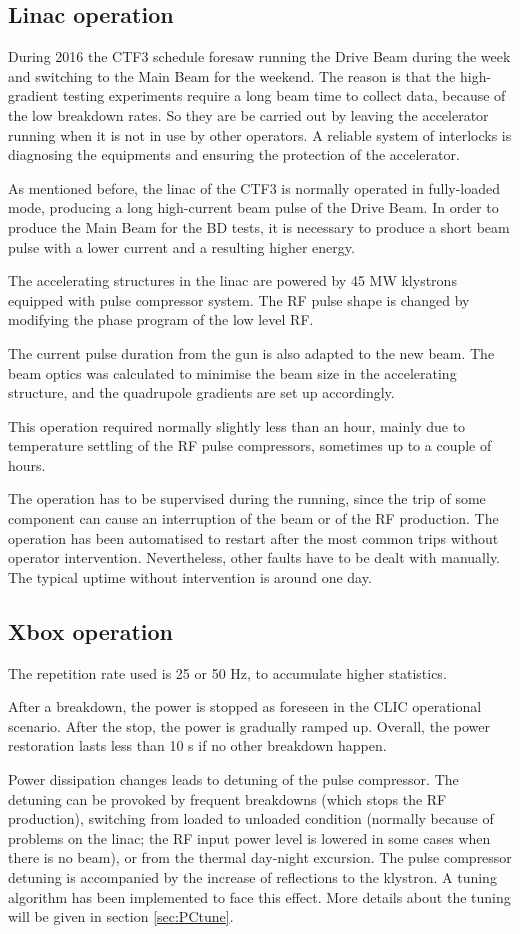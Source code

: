\subsection{Linac operation}

During 2016 the CTF3 schedule foresaw running the Drive Beam during the week and switching to the Main Beam for the weekend. The reason is that the high-gradient testing experiments require a long beam time to collect data, because of the low breakdown rates. So they are be carried out by leaving the accelerator running when it is not in use by other operators. A reliable system of interlocks is diagnosing the equipments and ensuring the protection of the accelerator. 

As mentioned before, the linac of the CTF3 is normally operated in fully-loaded mode, producing a long  high-current beam pulse of the Drive Beam. In order to produce the Main Beam for the BD tests, it is necessary to produce a short beam pulse with a lower current and a resulting higher energy. 

The accelerating structures in the linac are powered by 45 MW klystrons equipped with pulse compressor system. 
The RF pulse shape is changed by modifying the phase program of the low level RF.

The current pulse duration from the gun is also adapted to the new beam. The beam optics was calculated to minimise the beam size in the accelerating structure, and the quadrupole gradients are set up accordingly.

This operation required normally slightly less than an hour, mainly due to temperature settling of the RF pulse compressors, sometimes up to a couple of hours.

The operation has to be supervised during the running, since the trip of some component can cause an interruption of the beam or of the RF production. The operation has been automatised to restart after the most common trips without operator intervention. Nevertheless, other faults have to be dealt with manually. The typical uptime without intervention is around one day.

\subsection{Xbox operation}
\label{sec:xboxop}

The repetition rate used is 25 or 50 Hz, to accumulate higher statistics.

After a breakdown, the power is stopped as foreseen in the CLIC operational scenario. After the stop, the power is gradually ramped up. Overall, the power restoration lasts less than 10 s if no other breakdown happen.

Power dissipation changes leads to detuning of the pulse compressor. The detuning can be provoked by frequent breakdowns (which stops the RF production),  switching from loaded to unloaded condition (normally because of problems on the linac; the RF input power level is lowered in some cases when there is no beam), or from the thermal day-night excursion. The pulse compressor detuning is accompanied by the increase of reflections to the klystron. A tuning algorithm has been implemented to face this effect. More details about the tuning will be given in section \ref{sec:PCtune}.